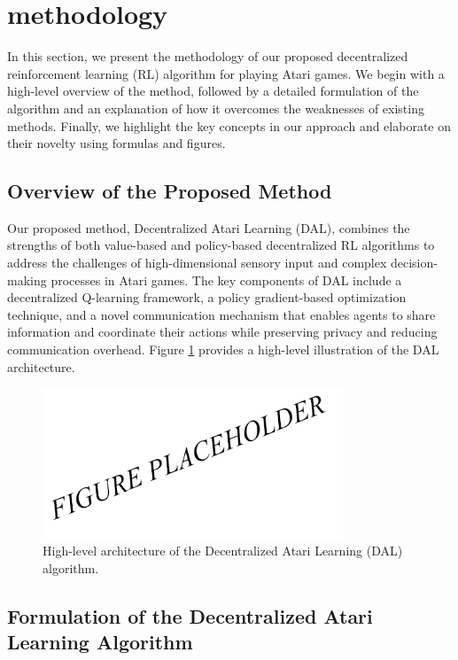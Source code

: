 \section{methodology}

In this section, we present the methodology of our proposed decentralized reinforcement learning (RL) algorithm for playing Atari games. We begin with a high-level overview of the method, followed by a detailed formulation of the algorithm and an explanation of how it overcomes the weaknesses of existing methods. Finally, we highlight the key concepts in our approach and elaborate on their novelty using formulas and figures.

\subsection{Overview of the Proposed Method}

Our proposed method, Decentralized Atari Learning (DAL), combines the strengths of both value-based and policy-based decentralized RL algorithms to address the challenges of high-dimensional sensory input and complex decision-making processes in Atari games. The key components of DAL include a decentralized Q-learning framework, a policy gradient-based optimization technique, and a novel communication mechanism that enables agents to share information and coordinate their actions while preserving privacy and reducing communication overhead. Figure \ref{fig1} provides a high-level illustration of the DAL architecture.

\begin{figure}[h]
  \centering
  \includegraphics[width=0.8\textwidth]{fig1.png}
  \caption{High-level architecture of the Decentralized Atari Learning (DAL) algorithm.}
  \label{fig1}
\end{figure}

\subsection{Formulation of the Decentralized Atari Learning Algorithm}

